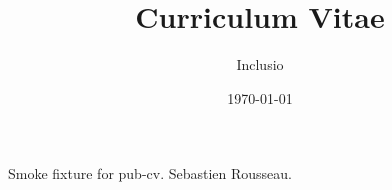 \documentclass[final,tagged]{pub-cv}
\title{Curriculum Vitae}
\author{Inclusio}
\date{\today}
\begin{document}
Smoke fixture for pub-cv. Sebastien Rousseau.
\end{document}

